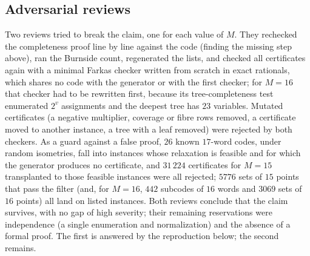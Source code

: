 \documentclass[11pt]{amsart}
\theoremstyle{definition}
\theoremstyle{remark}
\begin{document}
\subsection*{Adversarial reviews}
Two reviews tried to break the claim, one for each value of $M$.
They rechecked the completeness proof line by line against the code (finding the missing step above), ran the Burnside count, regenerated the lists, and checked all certificates again with a minimal Farkas checker written from scratch in exact rationals, which shares no code with the generator or with the first checker; for $M=16$ that checker had to be rewritten first, because its tree-completeness test enumerated $2^v$ assignments and the deepest tree has $23$ variables.
Mutated certificates (a negative multiplier, coverage or fibre rows removed, a certificate moved to another instance, a tree with a leaf removed) were rejected by both checkers.
As a guard against a false proof, $26$ known $17$-word codes, under random isometries, fall into instances whose relaxation is feasible and for which the generator produces no certificate, and $31\,224$ certificates for $M=15$ transplanted to those feasible instances were all rejected; $5776$ sets of $15$ points that pass the filter (and, for $M=16$, $442$ subcodes of $16$ words and $3069$ sets of $16$ points) all land on listed instances.
Both reviews conclude that the claim survives, with no gap of high severity; their remaining reservations were independence (a single enumeration and normalization) and the absence of a formal proof. The first is answered by the reproduction below; the second remains.
\end{document}
